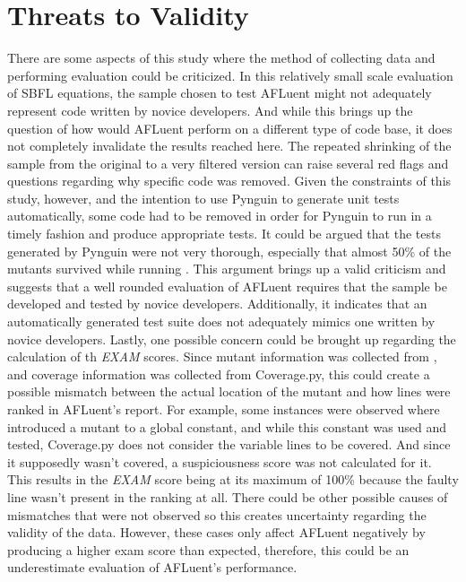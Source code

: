 \section{Threats to Validity}

There are some aspects of this study where the method of collecting data and
performing evaluation could be criticized. In this relatively small scale
evaluation of SBFL equations, the sample chosen to test AFLuent might not
adequately represent code written by novice developers. And while this brings up
the question of how would AFLuent perform on a different type of code base, it
does not completely invalidate the results reached here. The repeated shrinking of the
sample from the original  to a very filtered version
can raise several red flags and questions regarding why specific code was
removed. Given the constraints of this study, however, and the intention to
use Pynguin to generate unit tests automatically, some code had to be removed in order
for Pynguin to run in a timely fashion and produce appropriate tests. It could
be argued that the tests generated by Pynguin were not very thorough, especially
that almost 50\% of the mutants survived while running . This
argument brings up a valid criticism and suggests that a well rounded evaluation
of AFLuent requires that the sample be developed and tested by novice developers. Additionally, it indicates that an automatically generated
test suite does not adequately mimics one written by novice developers.
Lastly, one possible concern could be brought up regarding the calculation of th
\emph{EXAM} scores. Since mutant information was collected from ,
and coverage information was collected from Coverage.py, this could create a
possible mismatch between the actual location of the mutant and how lines were
ranked in AFLuent's report. For example, some instances were observed where
 introduced a mutant to a global constant, and while this constant
was used and tested, Coverage.py does not consider the variable lines to be
covered. And since it supposedly wasn't covered, a suspiciousness score was not
calculated for it. This results in the \emph{EXAM} score being at its maximum of
100\% because the faulty line wasn't present in the ranking at all. There could
be other possible causes of mismatches that were not observed so this creates
uncertainty regarding the validity of the data. However, these cases only affect
AFLuent negatively by producing a higher exam score than expected, therefore,
this could be an underestimate evaluation of AFLuent's performance.